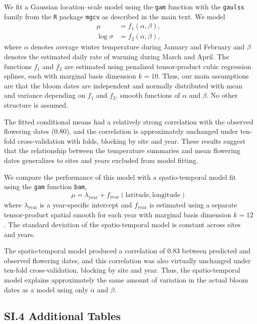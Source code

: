 \documentclass[12pt,letterpaper]{article}
\begin{document}
We fit a Gaussian location–scale model using the \texttt{gam} function with the \texttt{gaulss} family from the \texttt{R} package \texttt{mgcv} as described in the main text. We model
\begin{align*}
\mu &= f_1(\alpha,\beta),\\[0.5em]
\log \sigma &= f_2(\alpha,\beta),
\end{align*}
where \(\alpha\) denotes average winter temperature during January and February and \(\beta\) denotes the estimated daily rate of warming during March and April. The functions \(f_1\) and \(f_2\) are estimated using penalized tensor-product cubic regression splines, each with marginal basis dimension \(k=10\). Thus, our main assumptions are that the bloom dates are independent and normally distributed with mean and variance depending on \(f_1\) and \(f_2\), smooth functions of \(\alpha\) and \(\beta\). No other structure is assumed.

The fitted conditional means had a relatively strong correlation with the observed flowering dates (\(0.80\)), and the correlation is approximately unchanged under ten-fold cross-validation with folds, blocking by site and year. These results suggest that the relationship between the temperature summaries and mean flowering dates generalizes to sites and years excluded from model fitting.

We compare the performance of this model with a spatio-temporal model fit using the \texttt{gam} function \texttt{bam}, \[\mu =\lambda_{\mathrm{year}}
+f_{\mathrm{year}}(\mathrm{latitude},\mathrm{longitude})\]
where \(\lambda_{\mathrm{year}}\) is a year-specific intercept and \(f_{\mathrm{year}}\) is estimated using a separate tensor-product spatial smooth for each year with marginal basis dimension \(k=12\). The standard deviation of the spatio-temporal model is constant across sites and years.

The spatio-temporal model produced a correlation of \(0.83\) between predicted and observed flowering dates, and this correlation was also virtually unchanged under ten-fold cross-validation, blocking by site and year. Thus, the spatio-temporal model explains approximately the same amount of variation in the actual bloom dates as a model using only \(\alpha\) and \(\beta\).


\subsection*{SI.4 Additional Tables}\label{si-additional-tables}
\end{document}
